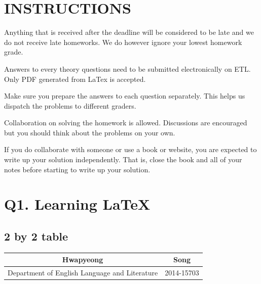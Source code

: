 \documentclass{article}
\begin{document}
\pagestyle{fancy}

\section*{INSTRUCTIONS}

\begin{itemize*}
\item Anything
  that is received after the deadline will be considered to be late and we do not receive late homeworks. We do however ignore your lowest homework grade. 
\item Answers to every theory questions need to be submitted
  electronically on ETL. Only PDF generated from LaTex is accepted.
\item Make sure you prepare the answers to each question
  separately. This helps us dispatch the problems to different graders.
\item Collaboration on solving the homework is allowed. Discussions
  are encouraged but you should think about the problems on your own. 
\item If you do collaborate with someone or use a book or website, you
  are expected to write up your solution independently.  That is,
  close the book and all of your notes before starting to write up
  your solution.
\end{itemize*}


\section{Q1. Learning \LaTeX{}}
\subsection{2 by 2 table}
  \begin{tabular}{|c|c|}
    \hline
    Hwapyeong & Song \\
    \hline
    Department of English Language and Literature & 2014-15703 \\
    \hline
  \end{tabular}
\end{document}
